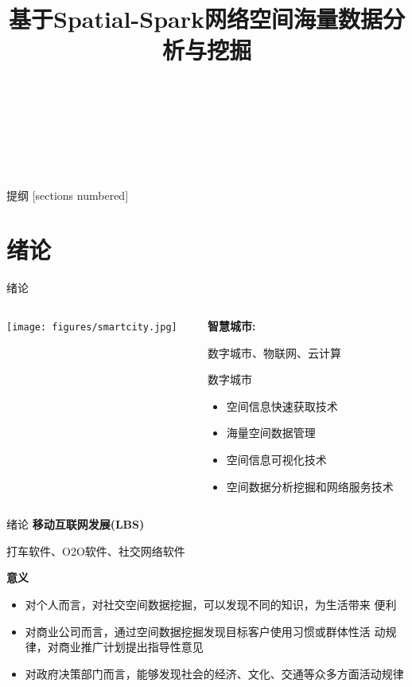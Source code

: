 \documentclass{beamer}
\title{基于Spatial-Spark网络空间海量数据分析与挖掘}
\author[高峰]{
    \makebox[2.5em][s]{姓名:} \makebox[3em][s]{高峰}\\
    \makebox[2.5em][s]{导师:} \makebox[3em][s]{高井祥} \\
    \makebox[2.5em][s]{} \makebox[3em]{孙久运} \\
    \makebox[2.5em][s]{专业:} \makebox[10em][l]{大地测量学与测量工程}\\
}
\date{}
\begin{document}
\maketitle

\begin{frame}{提纲}
  [sections numbered]
  \tableofcontents[hideallsubsections]
\end{frame}

\section{绪论}

\begin{frame}{绪论}
    \begin{columns}
        \begin{column}{0.5\textwidth}
        \texttt{[image: figures/smartcity.jpg]}
        \end{column}

        \begin{column}{0.5\textwidth}
        \textbf{智慧城市:} 
        
        数字城市、物联网、云计算
        \vspace{2em}

        \pause
        \alert{数字城市}
        \begin{itemize}
        \pause
        \item 空间信息快速获取技术
        \pause
        \item 海量空间数据管理
        \pause
        \item 空间信息可视化技术
        \pause
        \item 空间数据分析挖掘和网络服务技术
        \end{itemize}
        \end{column}
   \end{columns}
\end{frame}

\begin{frame}{绪论}
    \textbf{移动互联网发展(LBS)}

    打车软件、O2O软件、社交网络软件

    \vspace{2em}
    \pause
    \textbf{意义}
    \begin{itemize}
        \pause
        \item 对个人而言，对社交空间数据挖掘，可以发现不同的知识，为生活带来 便利
        \pause
        \item 对商业公司而言，通过空间数据挖掘发现目标客户使用习惯或群体性活 动规律，对商业推广计划提出指导性意见
        \pause
        \item 对政府决策部门而言，能够发现社会的经济、文化、交通等众多方面活动规律
    \end{itemize}
\end{frame}
\end{document}
